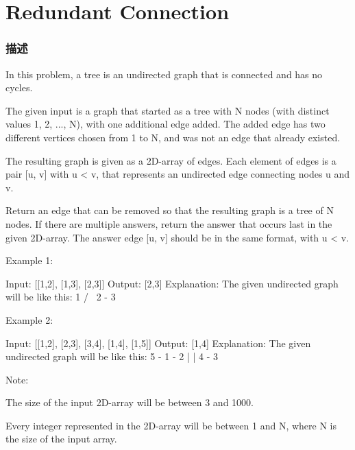 \section{Redundant Connection} %
\label{sec:redundant-connection}

\subsubsection{描述}
In this problem, a tree is an undirected graph that is connected and has no cycles.

The given input is a graph that started as a tree with N nodes (with distinct values 1, 2, ..., N), with one additional edge added. The added edge has two different vertices chosen from 1 to N, and was not an edge that already existed.

The resulting graph is given as a 2D-array of edges. Each element of edges is a pair [u, v] with u < v, that represents an undirected edge connecting nodes u and v.

Return an edge that can be removed so that the resulting graph is a tree of N nodes. If there are multiple answers, return the answer that occurs last in the given 2D-array. The answer edge [u, v] should be in the same format, with u < v.


Example 1:
\begin{Code}
Input: [[1,2], [1,3], [2,3]]
Output: [2,3]
Explanation: The given undirected graph will be like this:
  1
 / \
2 - 3
\end{Code}

Example 2:
\begin{Code}
Input: [[1,2], [2,3], [3,4], [1,4], [1,5]]
Output: [1,4]
Explanation: The given undirected graph will be like this:
5 - 1 - 2
    |   |
    4 - 3
\end{Code}


Note:
\begindot
\item The size of the input 2D-array will be between 3 and 1000.
\item Every integer represented in the 2D-array will be between 1 and N, where N is the size of the input array.
\myenddot



